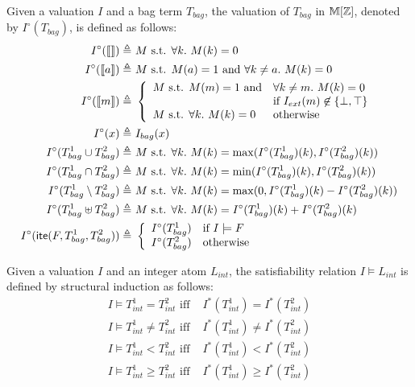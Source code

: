 Given a valuation $I$ and a bag term $T_{bag}$, the valuation of $T_{bag}$ in $\mathbb{M}[\mathbb{Z}]$,
denoted by $I^\circ(T_{bag})$, is defined as follows:
\begin{align*}
I^\circ(\llbracket  \rrbracket) \triangleq&\ M \mbox{ s.t. }\forall k.~M(k)=0
\\
I^\circ(\llbracket a \rrbracket) \triangleq&\ M \mbox{ s.t. }M(a)=1 \mbox{ and } \forall k\neq a.~M(k)=0
\\
I^\circ(\llbracket m \rrbracket) \triangleq&\
\left\{\begin{array}{ll}
M \mbox{ s.t. } M(m)=1 \mbox{ and} & \forall k\neq m.~M(k)=0 \\
  & \mbox{if } I_{ext}(m) \not\in\{\bot,\top\} \\
M \mbox{ s.t. } \forall k.~M(k)=0 & \mbox{otherwise}
\end{array}\right.
\\
I^\circ(x) \triangleq&\ I_{bag}(x)
\\
I^\circ(T^1_{bag} \cup T^2_{bag}) \triangleq&\ M\mbox{ s.t. }\forall k.~M(k)=\max(I^\circ(T^1_{bag})(k), I^\circ(T^2_{bag})(k))
\\
I^\circ(T^1_{bag} \cap T^2_{bag}) \triangleq&\ M\mbox{ s.t. }\forall k.~M(k)=\min(I^\circ(T^1_{bag})(k), I^\circ(T^2_{bag})(k))
\\
I^\circ(T^1_{bag} \setminus T^2_{bag}) \triangleq&\ M\mbox{ s.t. }\forall k.~M(k)=\max(0, I^\circ(T^1_{bag})(k) - I^\circ(T^2_{bag})(k))
\\
I^\circ(T^1_{bag} \uplus T^2_{bag}) \triangleq&\ M\mbox{ s.t. }\forall k.~M(k)=I^\circ(T^1_{bag})(k) + I^\circ(T^2_{bag})(k)
\\
I^\circ(\textsf{ite}(F,T^1_{bag},T^2_{bag})) \triangleq&\
\left\{\begin{array}{ll}
I^\circ(T^1_{bag}) & \mbox{if } I \models F \\
I^\circ(T^2_{bag}) & \mbox{otherwise}
\end{array}\right.
\end{align*}

Given a valuation $I$ and an integer atom $L_{int}$, the satisfiability relation $I \models L_{int}$ is defined by structural induction as follows:
\begin{align*}
I \models T^1_{int}=T^2_{int} \mbox{ iff }& I^*(T^1_{int}) = I^*(T^2_{int}) \\
I \models T^1_{int}\ne T^2_{int} \mbox{ iff }& I^*(T^1_{int}) \ne I^*(T^2_{int}) \\
I \models T^1_{int} < T^2_{int} \mbox{ iff }& I^*(T^1_{int}) < I^*(T^2_{int}) \\
I \models T^1_{int}\ge T^2_{int} \mbox{ iff }& I^*(T^1_{int}) \ge I^*(T^2_{int})
\end{align*}

